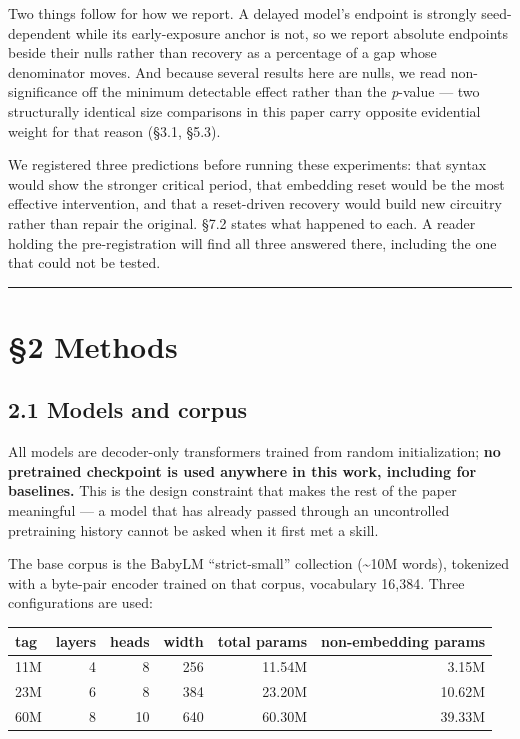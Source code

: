 \documentclass{article}
\begin{document}
Two things follow for how we report. A delayed model's endpoint is strongly seed-dependent
while its early-exposure anchor is not, so we report absolute endpoints beside their nulls
rather than recovery as a percentage of a gap whose denominator moves. And because several
results here are nulls, we read non-significance off the minimum detectable effect rather
than the \emph{p}-value --- two structurally identical size comparisons in this paper carry
opposite evidential weight for that reason (§3.1, §5.3).

We registered three predictions before running these experiments: that syntax would show the
stronger critical period, that embedding reset would be the most effective intervention, and
that a reset-driven recovery would build new circuitry rather than repair the original. §7.2
states what happened to each. A reader holding the pre-registration will find all three
answered there, including the one that could not be tested.

\begin{center}\rule{0.5\linewidth}{0.5pt}\end{center}

\section{§2 Methods}\label{methods}

\subsection{2.1 Models and corpus}\label{models-and-corpus}

All models are decoder-only transformers trained from random initialization; \textbf{no pretrained
checkpoint is used anywhere in this work, including for baselines.} This is the design
constraint that makes the rest of the paper meaningful --- a model that has already passed
through an uncontrolled pretraining history cannot be asked when it first met a skill.

The base corpus is the BabyLM ``strict-small'' collection (\textasciitilde10M words), tokenized with a
byte-pair encoder trained on that corpus, vocabulary 16,384. Three configurations are used:

\begin{table}[t]
\centering\small
\begin{tabular}{@{}lrrrrr@{}}
\toprule\noalign{}
tag & layers & heads & width & total params & non-embedding params \\
\midrule\noalign{}

11M & 4 & 8 & 256 & 11.54M & 3.15M \\
23M & 6 & 8 & 384 & 23.20M & 10.62M \\
60M & 8 & 10 & 640 & 60.30M & 39.33M \\
\bottomrule
\end{tabular}
\end{table}
\end{document}
